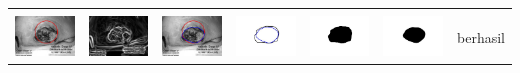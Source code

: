 \begin{table}[H]
\begin{tabular}{|m{0.7in}|m{0.7in}|m{0.7in}|m{0.7in}|m{0.7in}|m{0.7in}|m{0.7in}|}
		&  &  & & & &  \\
		\includegraphics[width=0.7in]{dataset/dataset_3/luka_hitam/ready/33_interp_init.jpg}&
		\includegraphics[width=0.7in]{dataset/dataset_3/luka_hitam/ready/33_interp_ext.jpg}&
		\includegraphics[width=0.7in]{dataset/dataset_3/luka_hitam/ready/33_interp_result.jpg}&
		\includegraphics[width=0.7in]{dataset/dataset_3/luka_hitam/ready/33_gt_r.jpg}&
		\includegraphics[width=0.7in]{dataset/dataset_3/luka_hitam/ready/33_r.jpg}&
		\includegraphics[width=0.7in]{dataset/dataset_3/luka_hitam/ready/33_interp_r.jpg}&
		berhasil\\
		\hline
		

\end{tabular}
\end{table}
